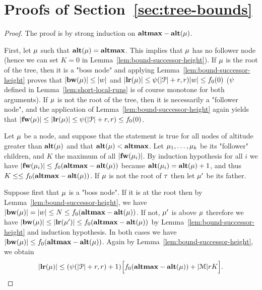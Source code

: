 \section{Proofs of Section~\ref{sec:tree-bounds}}

\lemBoundLengthHeightH*

\begin{proof}
	The proof is by strong induction on $\mathbf{altmax}-\mathbf{alt}(\mu)$.

	First, let $\mu$ such that $\mathbf{alt}(\mu) = \mathbf{altmax}$. This implies that $\mu$ has no follower node (hence we can set $K=0$ in Lemma~\ref{lem:bound-successor-height}).  If $\mu$ is the root of the tree, then it is a "boss node" and applying Lemma~\ref{lem:bound-successor-height} proves that $|\mathbf{bw}(\mu)| \leq |w|$ and $|\mathbf{lr}(\mu)| \leq \psi(|\mathcal{P}|+r,r) |w| \leq f_0(0)$ ($\psi$ defined in Lemma~\ref{lem:short-local-runs} is of course monotone for both arguments). If $\mu$ is not the root of the tree, then it is necessarily a "follower node", and the application of Lemma~\ref{lem:bound-successor-height} again yields that $|\mathbf{fw}(\mu)| \leq |\mathbf{lr}(\mu)| \leq \psi(|\mathcal{P}|+r,r) \leq f_0(0)$.   

	Let $\mu$ be a node, and suppose that the statement is true for all nodes of altitude greater than $\mathbf{alt}(\mu)$ and that $\mathbf{alt}(\mu) < \mathbf{altmax}$. 
	Let $\mu_1, \ldots, \mu_k$ be its "follower" children, and $K$ the maximum of all $|\mathbf{fw}(\mu_i)|$.  By induction hypothesis for all $i$ we have 
	$|\mathbf{fw}(\mu_i)| \leq f_0(\mathbf{altmax}-\mathbf{alt}(\mu))$ because $\mathbf{alt}(\mu_i) = \mathbf{alt}(\mu)+1$, and thus $K \leq \leq f_0(\mathbf{altmax}-\mathbf{alt}(\mu))$. If $\mu$ is not the root of $\tau$ then let $\mu'$ be its father.
	
	Suppose first that $\mu$ is a "boss node". If it is at the root then by Lemma~\ref{lem:bound-successor-height}, we have $|\mathbf{bw}(\mu)| = |w| \leq N \leq f_0(\mathbf{altmax} - \mathbf{alt}(\mu))$. If not, $\mu'$ is above $\mu$ therefore we have $|\mathbf{bw}(\mu)| \leq |\mathbf{lr}(\mu')| \leq f_0(\mathbf{altmax} - \mathbf{alt}(\mu))$ by Lemma~\ref{lem:bound-successor-height} and induction hypothesis. In both cases we have $|\mathbf{bw}(\mu)| \leq f_0(\mathbf{altmax} - \mathbf{alt}(\mu))$.	
	Again by Lemma~\ref{lem:bound-successor-height}, we obtain \[|\mathbf{lr}(\mu)| \leq (\psi(|\mathcal{P}|+r,r)+1) \Big[f_0(\mathbf{altmax}-\mathbf{alt}(\mu)) + |\mathcal{M}|rK\Big]. \]
	

\end{proof}
